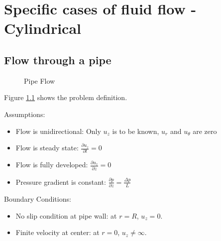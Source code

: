 \chapter{Specific cases of fluid flow - Cylindrical}
\label{ch:momcasescyl}

\section{Flow through a pipe}

\begin{figure}[h]
\begin{center}
\end{center}
\caption{Pipe Flow}
\label{pipeflow}
\end{figure}

Figure \ref{pipeflow} shows the problem definition.


Assumptions:
\begin{itemize}
\item Flow is unidirectional: Only $u_z$ is to be known, $u_r$ and $u_\theta$ are zero
\item Flow is steady state: $\frac{\partial u_z}{\partial t} = 0$
\item Flow is fully developed: $\frac{\partial u_z}{\partial z} = 0$
\item Pressure gradient is constant: $\frac{\partial p}{\partial z} = \frac{\Delta p}{L}$
\end{itemize}


Boundary Conditions:
\begin{itemize}
\item No slip condition at pipe wall: at $r=R$, $u_z=0$.
\item Finite velocity at center: at $r=0$, $u_z \ne \infty$.
\end{itemize}


